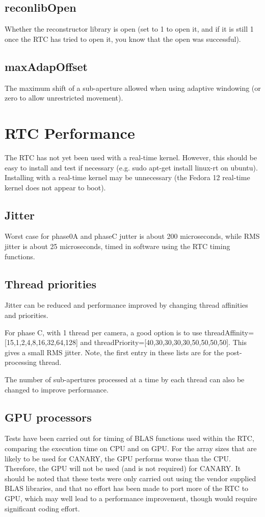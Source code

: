 \documentclass[a4,10pt]{article}
\begin{document}
\subsection{reconlibOpen}
Whether the reconstructor library is open (set to 1 to open it, and if
it is still 1 once the RTC has tried to open it, you know that the
open was successful).

\subsection{maxAdapOffset}
The maximum shift of a sub-aperture allowed when using adaptive
windowing (or zero to allow unrestricted movement).

\section{RTC Performance}
The RTC has not yet been used with a real-time kernel.  However, this
should be easy to install and test if necessary (e.g. sudo apt-get
install linux-rt on ubuntu).  Installing with a real-time kernel may
be unnecessary (the Fedora 12 real-time kernel does not appear to boot).

\subsection{Jitter}
Worst case for phase0A and phaseC jutter is about 200 microseconds,
while RMS jitter is about 25 microseconds, timed in software using the
RTC timing functions.

\subsection{Thread priorities}
Jitter can be reduced and performance improved by changing thread
affinities and priorities.

For phase C, with 1 thread per camera, a good option is to use
threadAffinity=[15,1,2,4,8,16,32,64,128] and
threadPriority=[40,30,30,30,30,50,50,50,50].  This gives a small RMS jitter.
Note, the first entry in these lists are for the post-processing
thread.

The number of sub-apertures processed at a time by each thread can
also be changed to improve performance.


\subsection{GPU processors}
Tests have been carried out for timing of BLAS functions used within
the RTC, comparing the execution time on CPU and on GPU.  For the
array sizes that are likely to be used for CANARY, the GPU performs
worse than the CPU.  Therefore, the GPU will not be used (and is not
required) for CANARY.  It should be noted that these tests were only
carried out using the vendor supplied BLAS libraries, and that no
effort has been made to port more of the RTC to GPU, which may well
lead to a performance improvement, though would require significant
coding effort.
\end{document}
